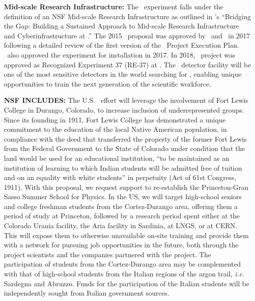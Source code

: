 {\bf Mid-scale Research Infrastructure:}
The \DSks\ experiment falls under the definition of an NSF Mid-scale Research Infrastructure as outlined in \NSF's ``Bridging the Gap: Building a Sustained Approach to Mid-scale Research Infrastructure and Cyberinfrastructure at \NSF.''  The 2015 \DSk\ proposal was approved by \INFN\ and \NSF\ in 2017 following a detailed review of the first version of the \DSk\ Project Execution Plan.  \LNGS\ also approved the experiment for installation in 2017.  In 2018, \DSk\ project was approved as Recognized Experiment 37 (RE-37) at \CERN.  The \DSks\ detector facility will be one of the most sensitive detectors in the world searching for \WIMPs, enabling unique opportunities to train the next generation of the scientific workforce.

{\bf NSF INCLUDES:}
The U.S. \DSk\ effort will leverage the involvement of Fort Lewis College in Durango, Colorado, to increase inclusion of underrepresented groups.  Since its founding in 1911, Fort Lewis College has demonstrated a unique commitment to the education of the local Native American population, in compliance with the deed that transferred the property of the former Fort Lewis from the Federal Government to the State of Colorado under condition that the land would be used for an educational institution, ``to be maintained as an institution of learning to which Indian students will be admitted free of tuition and on an equality with white students'' in perpetuity (Act of 61st Congress, 1911).  With this proposal, we request support to re-establish the Princeton-Gran Sasso Summer School for Physics. In the US, we will target high-school seniors and college freshman students from the Cortez-Durango area, offering them a period of study at Princeton, followed by a research period spent either at the Colorado Urania facility, the Aria facility in Sardinia, at LNGS, or at CERN.  This will expose them to otherwise unavailable on-site training and provide them with a network for pursuing job opportunities in the future, both through the project scientists and the companies partnered with the project.  The participation of students from the Cortez-Durango area may be complemented with that of high-school students from the Italian regions of the argon trail, {\it i.e.} Sardegna and Abruzzo. Funds for the participation of the Italian students will be independently sought from Italian government sources.


